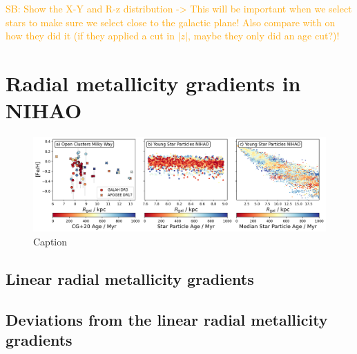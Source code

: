 \documentclass[fleqn,usenatbib]{mnras}
\newcommand{\SB}[1]{{\textcolor{orange}{SB: #1}}}
\begin{document}
%     

\SB{Show the X-Y and R-z distribution -> This will be important when we select stars to make sure we select close to the galactic plane! Also compare with \citet{Poggio2022} on how they did it (if they applied a cut in $\vert z \vert$, maybe they only did an age cut?)!}


\section{Radial metallicity gradients in NIHAO}
\label{sec:radial_metallicity_gradients}

\begin{figure}
    \centering
    \includegraphics[width=\textwidth]{figures/radial_metallicity_gradients_mw_vs_nihao.png}
    \caption{Caption}
    \label{fig:radial_metallicity_gradients_mw_vs_nihao}
\end{figure}


\subsection{Linear radial metallicity gradients}
\label{sec:linear_radial_metallicity_gradients}

\subsection{Deviations from the linear radial metallicity gradients}
\label{sec:deviations_radial_metallicity_gradients}
\end{document}
